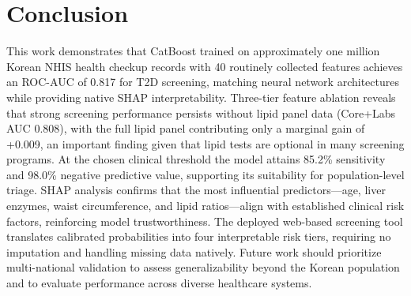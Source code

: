 \section{Conclusion}
\label{sec:conclusion}

This work demonstrates that CatBoost trained on approximately one million Korean NHIS health checkup records with 40 routinely collected features achieves an ROC-AUC of 0.817 for T2D screening, matching neural network architectures while providing native SHAP interpretability. Three-tier feature ablation reveals that strong screening performance persists without lipid panel data (Core+Labs AUC 0.808), with the full lipid panel contributing only a marginal gain of +0.009, an important finding given that lipid tests are optional in many screening programs. At the chosen clinical threshold the model attains 85.2\% sensitivity and 98.0\% negative predictive value, supporting its suitability for population-level triage. SHAP analysis confirms that the most influential predictors---age, liver enzymes, waist circumference, and lipid ratios---align with established clinical risk factors, reinforcing model trustworthiness. The deployed web-based screening tool translates calibrated probabilities into four interpretable risk tiers, requiring no imputation and handling missing data natively. Future work should prioritize multi-national validation to assess generalizability beyond the Korean population and to evaluate performance across diverse healthcare systems.
